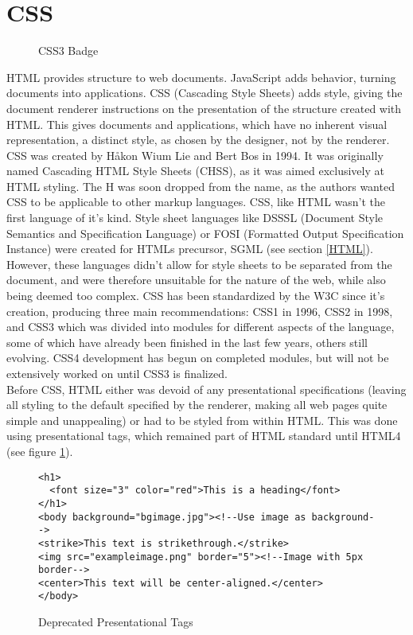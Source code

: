 \section{CSS} \label{CSS}
\begin{figure}[h]
\centering

\caption{CSS3 Badge}
\end{figure}
HTML provides structure to web documents. JavaScript adds behavior, turning documents into applications. CSS (Cascading
Style Sheets) adds style, giving the document renderer instructions on the presentation of the structure created with HTML.
This gives documents and applications, which have no inherent visual representation, a distinct style, as chosen by the
designer, not by the renderer. CSS was created by Håkon Wium Lie and Bert Bos in 1994. It was originally named Cascading
HTML Style Sheets (CHSS), as it was aimed exclusively at HTML styling. The H was soon dropped from the name, as the authors
wanted CSS to be applicable to other markup languages. CSS, like HTML wasn't the first language of it's kind. Style sheet
languages like DSSSL (Document Style Semantics and Specification Language) or FOSI (Formatted Output Specification
Instance) were created for HTMLs precursor, SGML (see section \ref{HTML}). However, these languages didn't allow for style
sheets to be separated from the document, and were therefore unsuitable for the nature of the web, while also being deemed
too complex. CSS has been standardized by the W3C since it's creation, producing three main recommendations:
CSS1 in 1996, CSS2 in 1998, and CSS3 which was divided into modules for different aspects of the language, some of which
have already been finished in the last few years, others still evolving. CSS4 development has begun on completed modules,
but will not be extensively worked on until CSS3 is finalized.\\

Before CSS, HTML either was devoid of any presentational specifications (leaving all styling to the default specified by
the renderer, making all web pages quite simple and unappealing) or had to be styled from within HTML. This was done using
presentational tags, which remained part of HTML standard until HTML4 (see figure \ref{presentational_tags}).\\
\begin{figure}[h]
\centering
{}
\begin{verbatim}
<h1>
  <font size="3" color="red">This is a heading</font>
</h1>
<body background="bgimage.jpg"><!--Use image as background-->
<strike>This text is strikethrough.</strike>
<img src="exampleimage.png" border="5"><!--Image with 5px border-->
<center>This text will be center-aligned.</center>
</body>
\end{verbatim}
\caption{Deprecated Presentational Tags \label{presentational_tags}}
\end{figure}


